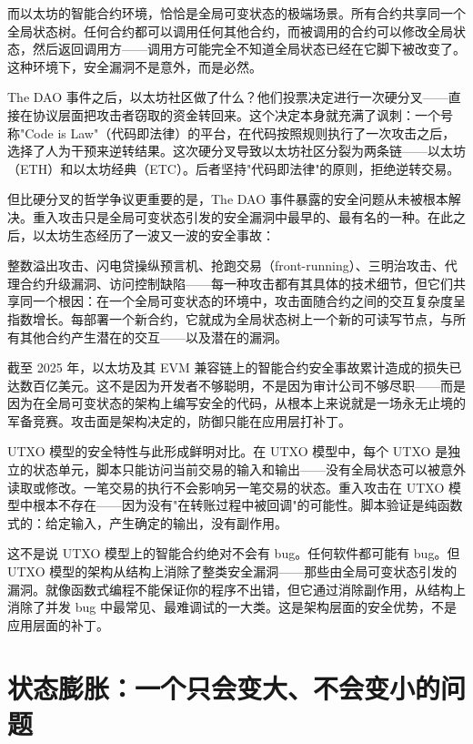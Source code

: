 \documentclass[a4paper,12pt,openany]{ctexbook}
\begin{document}
而以太坊的智能合约环境，恰恰是全局可变状态的极端场景。所有合约共享同一个全局状态树。任何合约都可以调用任何其他合约，而被调用的合约可以修改全局状态，然后返回调用方——调用方可能完全不知道全局状态已经在它脚下被改变了。这种环境下，安全漏洞不是意外，而是必然。

The DAO 事件之后，以太坊社区做了什么？他们投票决定进行一次硬分叉——直接在协议层面把攻击者窃取的资金转回来。这个决定本身就充满了讽刺：一个号称"Code is Law"（代码即法律）的平台，在代码按照规则执行了一次攻击之后，选择了人为干预来逆转结果。这次硬分叉导致以太坊社区分裂为两条链——以太坊（ETH）和以太坊经典（ETC）。后者坚持"代码即法律"的原则，拒绝逆转交易。

但比硬分叉的哲学争议更重要的是，The DAO 事件暴露的安全问题从未被根本解决。重入攻击只是全局可变状态引发的安全漏洞中最早的、最有名的一种。在此之后，以太坊生态经历了一波又一波的安全事故：

整数溢出攻击、闪电贷操纵预言机、抢跑交易（front-running）、三明治攻击、代理合约升级漏洞、访问控制缺陷——每一种攻击都有其具体的技术细节，但它们共享同一个根因：在一个全局可变状态的环境中，攻击面随合约之间的交互复杂度呈指数增长。每部署一个新合约，它就成为全局状态树上一个新的可读写节点，与所有其他合约产生潜在的交互——以及潜在的漏洞。

截至 2025 年，以太坊及其 EVM 兼容链上的智能合约安全事故累计造成的损失已达数百亿美元。这不是因为开发者不够聪明，不是因为审计公司不够尽职——而是因为在全局可变状态的架构上编写安全的代码，从根本上来说就是一场永无止境的军备竞赛。攻击面是架构决定的，防御只能在应用层打补丁。

UTXO 模型的安全特性与此形成鲜明对比。在 UTXO 模型中，每个 UTXO 是独立的状态单元，脚本只能访问当前交易的输入和输出——没有全局状态可以被意外读取或修改。一笔交易的执行不会影响另一笔交易的状态。重入攻击在 UTXO 模型中根本不存在——因为没有"在转账过程中被回调"的可能性。脚本验证是纯函数式的：给定输入，产生确定的输出，没有副作用。

这不是说 UTXO 模型上的智能合约绝对不会有 bug。任何软件都可能有 bug。但 UTXO 模型的架构从结构上消除了整类安全漏洞——那些由全局可变状态引发的漏洞。就像函数式编程不能保证你的程序不出错，但它通过消除副作用，从结构上消除了并发 bug 中最常见、最难调试的一大类。这是架构层面的安全优势，不是应用层面的补丁。


\section*{状态膨胀：一个只会变大、不会变小的问题}
\end{document}
